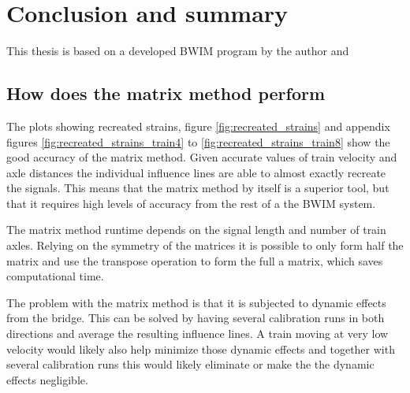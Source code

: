 \chapter{Conclusion and summary}
This thesis is based on a developed BWIM program by the author and



\section{How does the matrix method perform}
The plots showing recreated strains, figure \ref{fig:recreated_strains} and appendix figures \ref{fig:recreated_strains_train4} to \ref{fig:recreated_strains_train8} show the good accuracy of the matrix method. Given accurate values of train velocity and axle distances the individual influence lines are able to almost exactly recreate the signals. This means that the matrix method by itself is a superior tool, but that it requires high levels of accuracy from the rest of a the BWIM system.

The matrix method runtime depends on the signal length and number of train axles. Relying on the symmetry of the matrices it is possible to only form half the matrix and use the transpose operation to form the full a matrix, which saves computational time.

The problem with the matrix method is that it is subjected to dynamic effects from the bridge. This can be solved by having several calibration runs in both directions and average the resulting influence lines. A train moving at very low velocity would likely also help minimize those dynamic effects and together with several calibration runs this would likely eliminate or make the the dynamic effects negligible.

